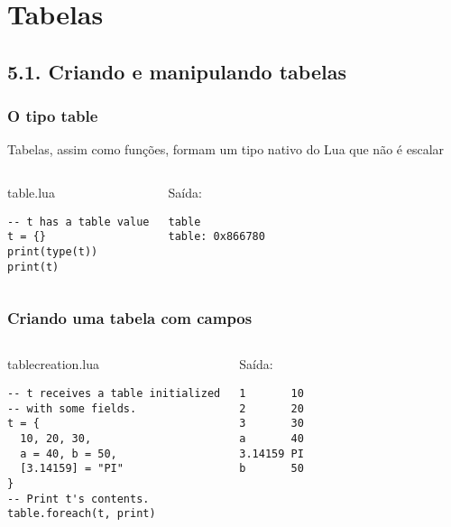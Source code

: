 \documentclass[brazil]{beamer}
\begin{document}
\section{Tabelas}
\subsection{5.1. Criando e manipulando tabelas}
\begin{frame}[fragile]
  \frametitle{O tipo table}
  \pause
  \begin{center}
    Tabelas, assim como funções, formam um tipo nativo do Lua
    que não é escalar
  \end{center}
  \pause
  \begin{columns}
      \begin{block}{table.lua}
        \begin{lstlisting}
-- t has a table value
t = {}
print(type(t))
print(t)
        \end{lstlisting}
      \end{block}
    \pause
      \begin{block}{Saída:}
        \begin{verbatim}
table
table: 0x866780  \end{verbatim}
      \end{block}
  \end{columns}
\end{frame}
\begin{frame}[fragile]
  \frametitle{Criando uma tabela com campos}
  \pause
  \begin{columns}
      \begin{block}{tablecreation.lua}
        \begin{lstlisting}
-- t receives a table initialized
-- with some fields.
t = {
  10, 20, 30,
  a = 40, b = 50,
  [3.14159] = "PI"
}
-- Print t's contents.
table.foreach(t, print)
        \end{lstlisting}
      \end{block}
    \pause
      \begin{block}{Saída:}
        \begin{verbatim}
1       10
2       20
3       30
a       40
3.14159 PI
b       50  \end{verbatim}
      \end{block}
  \end{columns}
\end{frame}
\end{document}
